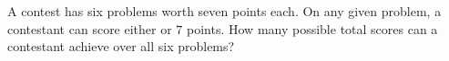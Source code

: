 A contest has six problems worth seven points each. On any given problem, a contestant can score either   or $7$ points. How many possible total scores can a contestant achieve over all six problems?